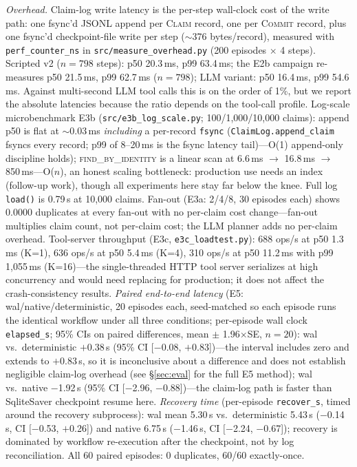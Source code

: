 \documentclass[10pt,journal,compsoc]{IEEEtran}
\begin{document}
\emph{Overhead.} Claim-log write latency is the per-step
wall-clock cost of the write path: one fsync'd JSONL append per
\textsc{Claim} record, one per \textsc{Commit} record, plus one
fsync'd checkpoint-file write per step ($\sim$376
bytes/record), measured with \texttt{perf\_counter\_ns} in
\texttt{src/measure\_overhead.py} (200 episodes $\times$ 4
steps). Scripted v2 ($n{=}798$ steps): p50 20.3\,ms, p99
63.4\,ms; the E2b campaign re-measures p50 21.5\,ms, p99
62.7\,ms ($n{=}798$); LLM variant: p50 16.4\,ms, p99 54.6\,ms.
Against multi-second LLM tool calls this is on the order of 1\%,
but we report the absolute latencies because the ratio depends
on the tool-call profile. Log-scale microbenchmark E3b
(\texttt{src/e3b\_log\_scale.py}; 100/1{,}000/10{,}000 claims):
append p50 is flat at $\sim$0.03\,ms \emph{including} a
per-record \texttt{fsync} (\texttt{ClaimLog.append\_claim}
fsyncs every record; p99 of 8--20\,ms is the fsync latency
tail)---O(1) append-only discipline holds); \textsc{find\_by\_identity} is a linear scan
at 6.6\,ms $\to$ 16.8\,ms $\to$ 850\,ms---O($n$), an honest
scaling bottleneck: production use needs an index (follow-up
work), though all experiments here stay far below the knee.
Full log \texttt{load()} is 0.79\,s at 10{,}000 claims.
Fan-out (E3a: 2/4/8, 30 episodes each) shows 0.0000 duplicates
at every fan-out with no per-claim cost change---fan-out
multiplies claim count, not per-claim cost; the LLM planner adds
no per-claim overhead. Tool-server throughput (E3c,
\texttt{e3c\_loadtest.py}): 688 ops/s at p50 1.3\,ms (K=1),
636 ops/s at p50 5.4\,ms (K=4), 310 ops/s at p50 11.2\,ms with
p99 1{,}055\,ms (K=16)---the single-threaded HTTP tool server
serializes at high concurrency and would need replacing for
production; it does not affect the crash-consistency results.
\emph{Paired end-to-end latency} (E5: wal/native/deterministic,
20 episodes each, seed-matched so each episode runs the identical
workflow under all three conditions; per-episode wall clock
\texttt{elapsed\_s}; 95\% CIs on paired differences, mean $\pm$
1.96$\times$SE, $n{=}20$): wal vs.\ deterministic $+$0.38\,s
(95\% CI $[-$0.08, $+$0.83])---the interval includes zero and
extends to $+$0.83\,s, so it is inconclusive about a difference
and does not establish negligible claim-log overhead (see
\S\ref{sec:eval} for the full E5 method);
wal vs.\ native $-$1.92\,s (95\% CI $[-$2.96, $-$0.88])---the
claim-log path is faster than SqliteSaver checkpoint resume here.
\emph{Recovery time} (per-episode \texttt{recover\_s}, timed
around the recovery subprocess): wal mean 5.30\,s vs.\
deterministic 5.43\,s ($-$0.14\,s, CI $[-$0.53, $+$0.26]) and
native 6.75\,s ($-$1.46\,s, CI $[-$2.24, $-$0.67]); recovery is
dominated by workflow re-execution after the checkpoint, not by
log reconciliation. All 60 paired episodes: 0 duplicates,
60/60 exactly-once.
\end{document}
